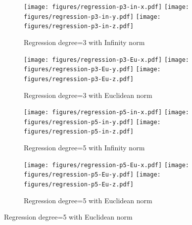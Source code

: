 \begin{figure}
\centering
\begin{subfigure}{\columnwidth}
\centering
\texttt{[image: figures/regression-p3-in-x.pdf]}
\texttt{[image: figures/regression-p3-in-y.pdf]}
\texttt{[image: figures/regression-p3-in-z.pdf]}
\caption{Regression degree=3 with Infinity norm}
\end{subfigure}
{\footnotesize}

\centering
\begin{subfigure}{\columnwidth}
\centering
\texttt{[image: figures/regression-p3-Eu-x.pdf]}
\texttt{[image: figures/regression-p3-Eu-y.pdf]}
\texttt{[image: figures/regression-p3-Eu-z.pdf]}
\caption{Regression degree=3 with Euclidean norm}
\end{subfigure}

\centering
\begin{subfigure}{\columnwidth}
\centering
\texttt{[image: figures/regression-p5-in-x.pdf]}
\texttt{[image: figures/regression-p5-in-y.pdf]}
\texttt{[image: figures/regression-p5-in-z.pdf]}
\caption{Regression degree=5 with Infinity norm}
\end{subfigure}
{\footnotesize}

\centering
\begin{subfigure}{\columnwidth}
\centering
\texttt{[image: figures/regression-p5-Eu-x.pdf]}
\texttt{[image: figures/regression-p5-Eu-y.pdf]}
\texttt{[image: figures/regression-p5-Eu-z.pdf]}
\caption{Regression degree=5 with Euclidean norm}
\label{fig:poly-regression}
\end{subfigure}

\end{figure}


